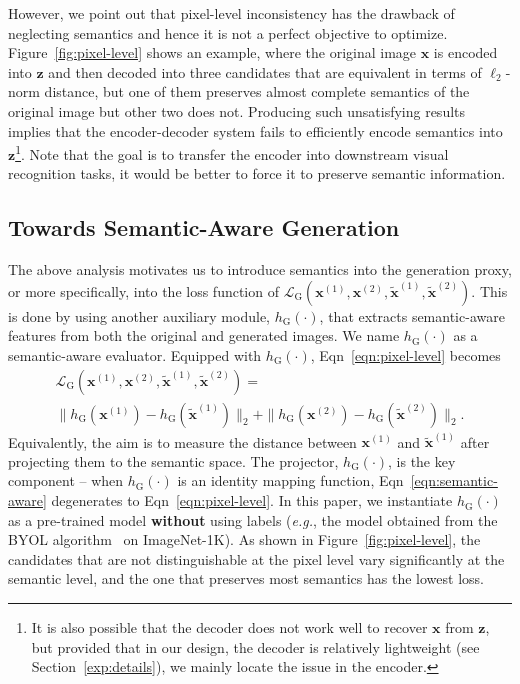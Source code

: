 \documentclass[10pt,twocolumn,letterpaper]{article}
\begin{document}
However, we point out that pixel-level inconsistency has the drawback of neglecting semantics and hence it is not a perfect objective to optimize. Figure~\ref{fig:pixel-level} shows an example, where the original image $\mathbf{x}$ is encoded into $\mathbf{z}$ and then decoded into three candidates that are equivalent in terms of $\ell_2$-norm distance, but one of them preserves almost complete semantics of the original image but other two does not. Producing such unsatisfying results implies that the encoder-decoder system fails to efficiently encode semantics into $\mathbf{z}$\footnote{It is also possible that the decoder does not work well to recover $\mathbf{x}$ from $\mathbf{z}$, but provided that in our design, the decoder is relatively lightweight (see Section~\ref{exp:details}), we mainly locate the issue in the encoder.}. Note that the goal is to transfer the encoder into downstream visual recognition tasks, it would be better to force it to preserve semantic information.

\subsection{Towards Semantic-Aware Generation}
\label{approach:generation}

The above analysis motivates us to introduce semantics into the generation proxy, or more specifically, into the loss function of $\mathcal{L}_\mathrm{G}(\mathbf{x}^{(1)},\mathbf{x}^{(2)},\tilde{\mathbf{x}}^{(1)},\tilde{\mathbf{x}}^{(2)})$. This is done by using another auxiliary module, $h_\mathrm{G}(\cdot)$, that extracts semantic-aware features from both the original and generated images. We name $h_\mathrm{G}(\cdot)$ as a semantic-aware evaluator. Equipped with $h_\mathrm{G}(\cdot)$, Eqn~\eqref{eqn:pixel-level} becomes
\begin{eqnarray}
\nonumber
\mathcal{L}_\mathrm{G}(\mathbf{x}^{(1)},\mathbf{x}^{(2)},\tilde{\mathbf{x}}^{(1)},\tilde{\mathbf{x}}^{(2)})=\\
\label{eqn:semantic-aware}
\|h_\mathrm{G}(\mathbf{x}^{(1)})-h_\mathrm{G}(\tilde{\mathbf{x}}^{(1)})\|_2+\|h_\mathrm{G}(\mathbf{x}^{(2)})-h_\mathrm{G}(\tilde{\mathbf{x}}^{(2)})\|_2.
\end{eqnarray}
Equivalently, the aim is to measure the distance between $\mathbf{x}^{(1)}$ and $\tilde{\mathbf{x}}^{(1)}$ after projecting them to the semantic space. The projector, $h_\mathrm{G}(\cdot)$, is the key component -- when $h_\mathrm{G}(\cdot)$ is an identity mapping function, Eqn~\eqref{eqn:semantic-aware} degenerates to Eqn~\eqref{eqn:pixel-level}. In this paper, we instantiate $h_\mathrm{G}(\cdot)$ as a pre-trained model \textbf{without} using labels (\textit{e.g.}, the model obtained from the BYOL algorithm~\cite{grill2020bootstrap} on ImageNet-1K). As shown in Figure~\ref{fig:pixel-level}, the candidates that are not distinguishable at the pixel level vary significantly at the semantic level, and the one that preserves most semantics has the lowest loss.
\end{document}
